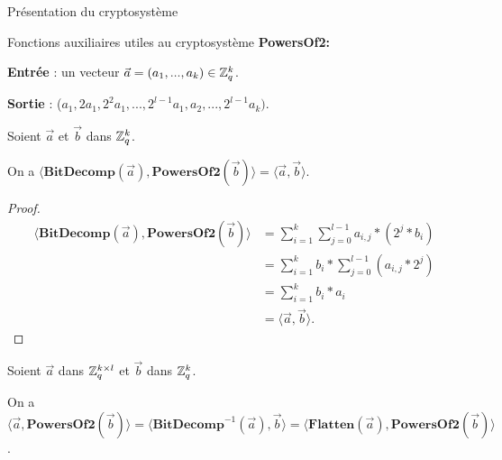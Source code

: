 \begin{section}{Présentation du cryptosystème}
\begin{subsection}{Fonctions auxiliaires utiles au cryptosystème}
\vspace{0.5cm}\noindent\textbf{PowersOf2:}
\flushleft

	\textbf{Entrée} : un vecteur $\vec{a} = (a_1, ..., a_k) \in \mathbb{Z}_q^{k}$.

	\textbf{Sortie} : ($a_1, 2 a_1, 2^{2} a_1, ..., 2^{l-1} a_1, a_2, ..., 2^{l-1} a_k)$.
	
	\begin{prop}
	Soient $\vec{a}$ et $\vec{b}$ dans $\mathbb{Z}_q^{k}$.

	On a $\langle \textbf{BitDecomp}(\vec{a}), \textbf{PowersOf2}(\vec{b}) \rangle = \langle\vec{a},\vec{b} \rangle$.
	\end{prop}

	\begin{proof}
	\begin{align*}
	\langle \textbf{BitDecomp}(\vec{a}), \textbf{PowersOf2}(\vec{b}) \rangle &= \sum\limits_{i=1}^{k} \sum\limits_{j=0}^{l-1} a_{i,j} * (2^{j} * b_i) \\
	&= \sum\limits_{i=1}^{k} b_i * \sum\limits_{j=0}^{l-1} (a_{i,j} * 2^{j}) \\
	&= \sum\limits_{i=1}^{k} b_i * a_i \\
	&= \langle\vec{a},\vec{b} \rangle.
	\end{align*}
	\end{proof}
	
	\begin{prop}
	Soient $\vec{a}$ dans $\mathbb{Z}_q^{k \times l}$ et $\vec{b}$ dans $\mathbb{Z}_q^{k}$.

	On a $\langle \vec{a}, \textbf{PowersOf2}(\vec{b}) \rangle = \langle \textbf{BitDecomp}^{-1}(\vec{a}), \vec{b}\rangle = \langle \textbf{Flatten}(\vec{a}),\textbf{PowersOf2}(\vec{b}) \rangle$.
	\end{prop}


\end{subsection}
\end{section}
